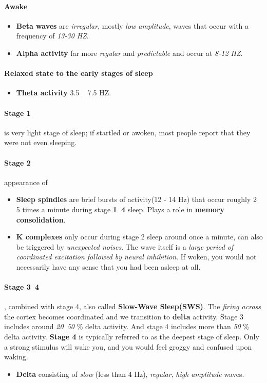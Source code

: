\documentclass{article}
\begin{document}
	\paragraph{Awake}
	\begin{itemize}
		\item \textbf{Beta waves} are \emph{irregular}, mostly \emph{low amplitude}, waves that occur with a frequency of \emph{13-30 HZ}.
		\item \textbf{Alpha activity} far more \emph{regular} and \emph{predictable} and occur at \emph{8-12 HZ}.
	\end{itemize}
	\paragraph{Relaxed state to the early stages of sleep}
	\begin{itemize}
		\item \textbf{Theta activity} 3.5 ~ 7.5 HZ.
	\end{itemize}
	\paragraph{Stage 1} is very light stage of sleep; if startled or awoken, most people report that they were not even sleeping.
	\paragraph{Stage 2} appearance of 
	\begin{itemize}
		\item \textbf{Sleep spindles} are brief bursts of activity(12 - 14 Hz) that occur roughly 2 ~ 5 times a minute during stage \textbf{1~4} sleep. Plays a role in \textbf{memory consolidation}.
		\item \textbf{K complexes} only occur during stage 2 sleep around once a minute, can also be triggered by \emph{unexpected noises}. The wave itself is a \emph{large period of coordinated excitation followed by neural inhibition}. If woken, you would not necessarily have any sense that you had been asleep at all.
	\end{itemize}
	\paragraph{Stage 3~4}, combined with stage 4, also called \textbf{Slow-Wave Sleep(SWS)}. The \emph{firing across} the cortex becomes coordinated and we transition to \textbf{delta} activity. Stage 3 includes around \emph{20~50} \% delta activity. And stage 4 includes more than \emph{50} \% delta activity. \textbf{Stage 4} is typically referred to as the deepest stage of sleep. Only a strong stimulus will wake you, and you would feel groggy and confused upon waking.
	\begin{itemize}
		\item \textbf{Delta} consisting of \emph{slow} (less than 4 Hz), \emph{regular}, \emph{high amplitude} waves.
	\end{itemize}
\end{document}
